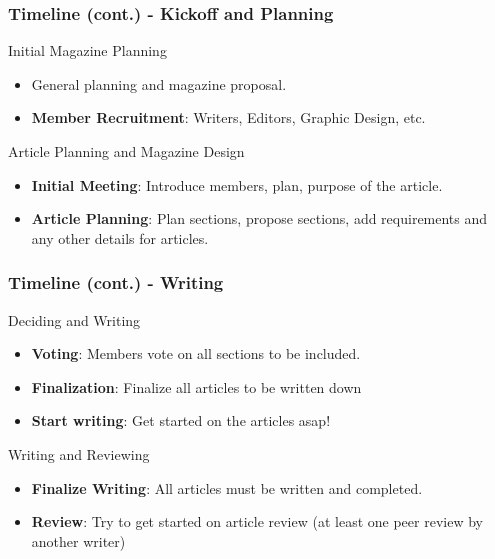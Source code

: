\documentclass{beamer}
\begin{document}
\begin{frame}
    \frametitle{Timeline (cont.) - Kickoff and Planning}
        
        \begin{description}
            \item<1->[Weeks 1-2 (August 31 to September 11)] Initial Magazine Planning
                \begin{itemize}
                    \item<2-> General planning and magazine proposal.
                    \item<3-> \textbf{Member Recruitment}: Writers, Editors, Graphic Design, etc.
                \end{itemize}

            \item<4->[Week 3 (September 14 to September 18)] Article Planning and Magazine Design
                \begin{itemize}
                    \item<5-> \textbf{Initial Meeting}: Introduce members, plan, purpose of the article.
                    \item<6-> \textbf{Article Planning}: Plan sections, propose sections, add requirements and any other details for articles.
                \end{itemize}
        \end{description}
        

\end{frame}

\begin{frame}
    \frametitle{Timeline (cont.) - Writing}

        \begin{description}
            \item<1->[Week 4 (September 21 to September 25)] Deciding and Writing
                \begin{itemize}
                    \item<2-> \textbf{Voting}: Members vote on all sections to be included.
                    \item<3-> \textbf{Finalization}: Finalize all articles to be written down
                    \item<4-> \textbf{Start writing}: Get started on the articles asap!
                \end{itemize}

            \item<5->[Weeks 5-6 (September 28 to October 9)] Writing and Reviewing
                \begin{itemize}
                    \item<6-> \textbf{Finalize Writing}: All articles must be written and completed.
                    \item<7-> \textbf{Review}: Try to get started on article review (at least one peer review by another writer)
                \end{itemize}
        \end{description}   
\end{frame}
\end{document}
